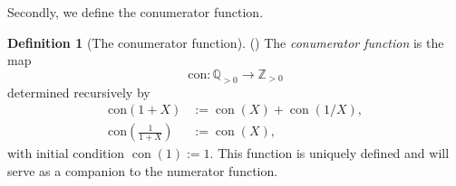 \documentclass[11pt,reqno]{amsart}
\numberwithin{equation}{section}
\numberwithin{table}{section}
\numberwithin{figure}{section}
\DeclareMathOperator{\con}{con}
\theoremstyle{plain}
\theoremstyle{definition}
\newtheorem{definition}[thm]{Definition}
\theoremstyle{remark}
\begin{document}
Secondly, we define the conumerator function.\begin{definition}[The conumerator function]{\normalfont(\cite{ULUDAG2022103192})}	The \emph{conumerator function} is the map	\begin{equation*}		\mathrm{con}: \mathbb{Q}_{>0} \longrightarrow \mathbb{Z}_{>0}	\end{equation*}	determined recursively by	\begin{align}\label{con:1}	\mathrm{con}(1+X) &:= \con(X) + \con(1/X),\\		\mathrm{con}\!\left(\tfrac{1}{1+X}\right) &:= \con(X),\label{con:2}	\end{align}	with initial condition $\con(1) := 1$. 	This function is uniquely defined and will serve as a companion to the numerator function.\end{definition}
\end{document}
